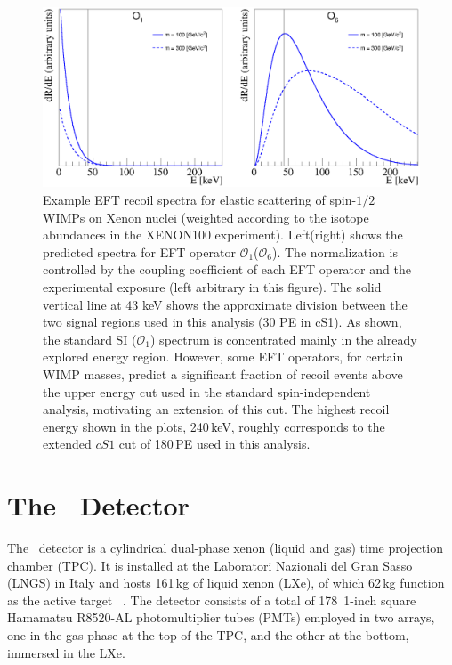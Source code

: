 \begin{figure}[t!]
\centerline{\includegraphics[width=1.\linewidth]{Figures/drdeO1O6.eps}}
\caption{Example EFT recoil spectra for elastic scattering of spin-$1/2$ WIMPs on Xenon nuclei (weighted according to the isotope abundances in the XENON100 experiment). Left(right) shows the predicted spectra for EFT operator $\mathcal{O}_1$($\mathcal{O}_6$). The normalization is controlled by the coupling coefficient of each EFT operator and the experimental exposure (left arbitrary in this figure). The solid vertical line at 43 keV shows the approximate division between the two signal regions used in this analysis (30 PE in cS1). As shown, the standard SI ($\mathcal{O}_1$) spectrum is concentrated mainly in the already explored energy region. However, some EFT operators, for certain WIMP masses, predict a significant fraction of recoil events above the upper energy cut used in the standard spin-independent analysis, motivating an extension of this cut. The highest recoil energy shown in the plots, 240\,keV, roughly corresponds to the extended $cS1$ cut of 180\,PE used in this analysis.}
\label{fig:dRdE}
\end{figure}

\section{The \Xehund\  Detector}
The \Xehund\ detector is a cylindrical %
dual-phase xenon (liquid and gas) time projection chamber (TPC). It is installed at the Laboratori Nazionali del Gran Sasso (LNGS) in Italy
and hosts 161\,kg of liquid xenon (LXe), of which 62\,kg function as the active target ~\cite{xe100_instr2012}. 
The detector consists of a total of 178~1-inch square Hamamatsu R8520-AL photomultiplier tubes (PMTs) employed in two arrays, one in the gas phase at the top of the TPC, and the other at the bottom, immersed in the LXe. 

